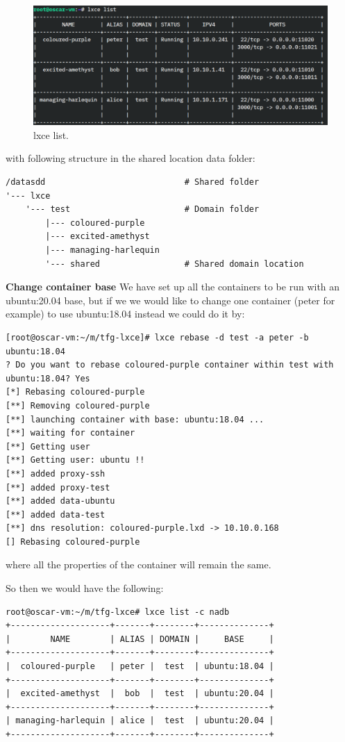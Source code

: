 \begin{figure}[H]
\label{fig:lxce list}
\centering
\includegraphics[width=\textwidth]{img/04/lxce-list.pdf}
\caption[Prototype setup]{\footnotesize{lxce list.}}
\end{figure}

with following structure in the shared location data folder:
\begin{verbatim}
/datasdd                            # Shared folder
'--- lxce
    '--- test                       # Domain folder
        |--- coloured-purple
        |--- excited-amethyst
        |--- managing-harlequin
        '--- shared                 # Shared domain location
\end{verbatim}

\textbf{Change container base}
We have set up all the containers to be run with an ubuntu:20.04 base, but if we we would like to change one container (peter for example) to use ubuntu:18.04 instead we could do it by:
\begin{verbatim}
[root@oscar-vm:~/m/tfg-lxce]# lxce rebase -d test -a peter -b ubuntu:18.04
? Do you want to rebase coloured-purple container within test with ubuntu:18.04? Yes
[*] Rebasing coloured-purple
[**] Removing coloured-purple
[**] launching container with base: ubuntu:18.04 ...
[**] waiting for container
[**] Getting user
[**] Getting user: ubuntu !!
[**] added proxy-ssh
[**] added proxy-test
[**] added data-ubuntu
[**] added data-test
[**] dns resolution: coloured-purple.lxd -> 10.10.0.168
[] Rebasing coloured-purple
\end{verbatim}
where all the properties of the container will remain the same.

So then we would have the following:
\begin{verbatim}
root@oscar-vm:~/m/tfg-lxce# lxce list -c nadb
+--------------------+-------+--------+--------------+
|        NAME        | ALIAS | DOMAIN |     BASE     |
+--------------------+-------+--------+--------------+
|  coloured-purple   | peter |  test  | ubuntu:18.04 |
+--------------------+-------+--------+--------------+
|  excited-amethyst  |  bob  |  test  | ubuntu:20.04 |
+--------------------+-------+--------+--------------+
| managing-harlequin | alice |  test  | ubuntu:20.04 |
+--------------------+-------+--------+--------------+
\end{verbatim}

